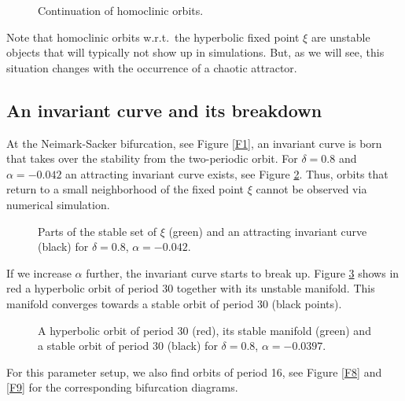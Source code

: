 \begin{figure}
\begin{center}
\end{center}
\caption{Continuation of homoclinic orbits.\label{F5}}
\end{figure}
 
Note that homoclinic orbits w.r.t.\ the hyperbolic fixed point $\xi$
are unstable objects that will typically not show up in simulations.
But, as we will see, this situation changes with the occurrence of a chaotic
attractor. 

\subsection{An invariant curve and its breakdown}
At the Neimark-Sacker bifurcation, see Figure \ref{F1}, an invariant
curve is born that takes over the stability from the two-periodic
orbit. For $\delta = 0.8$ and $\alpha = -0.042$ an
attracting invariant curve exists, see Figure \ref{F6}. Thus,
orbits that return to a small neighborhood of the fixed point $\xi$
cannot be observed via numerical simulation. 

\begin{figure}[H]
\begin{center}
\end{center}
\caption{Parts of the stable set of $\xi$ (green) and an attracting
  invariant curve (black) for $\delta = 0.8$, $\alpha = -0.042$.\label{F6}}
\end{figure}

If we increase $\alpha$ further, the invariant curve starts to break up. 
Figure \ref{F7} shows in red a hyperbolic orbit of period $30$
together with its unstable manifold. This manifold converges towards a
stable orbit of period $30$ (black points). 

\begin{figure}[H]
\begin{center}
\end{center}
\caption{A hyperbolic orbit of period $30$ (red), its stable manifold
  (green) and a stable orbit of period $30$ (black) for $\delta =
  0.8$, $\alpha = -0.0397$.\label{F7}} 
\end{figure}

For this parameter setup, we also find orbits of period 16, see Figure
\ref{F8} and \ref{F9} for the corresponding bifurcation diagrams.


